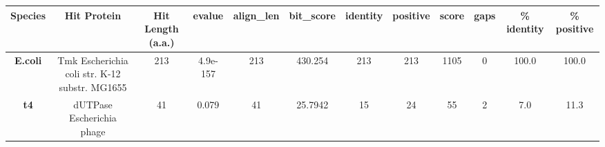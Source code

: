 \begin{tabular}{|c|c|c|c|c|c|c|c|c|c|c|c|} \hline
\textbf{Species} & \textbf{Hit Protein} & \textbf{Hit Length (a.a.)} & \textbf{evalue} & \textbf{align\_len} & \textbf{bit\_score} & \textbf{identity} & \textbf{positive} & \textbf{score} & \textbf{gaps} & \textbf{\% identity} & \textbf{\% positive} \\ \hline
\textbf{E.coli} & Tmk Escherichia coli str. K-12 substr. MG1655 & 213 & 4.9e-157 & 213 & 430.254 & 213 & 213 & 1105 & 0 & 100.0 & 100.0\\
\textbf{t4} & dUTPase Escherichia phage  & 41 & 0.079 & 41 & 25.7942 & 15 & 24 & 55 & 2 & 7.0 & 11.3\\
\hline \end{tabular}
